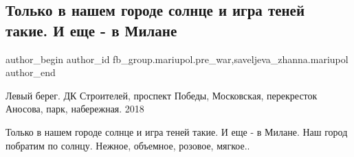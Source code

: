  
 
 
 
 

\subsection{Только в нашем городе солнце и игра теней такие. И еще - в Милане}
\label{sec:05_02_2023.fb.fb_group.mariupol.pre_war.1.tolko_v_nashem_gorod}
 
\ifcmt
 author_begin
   author_id fb_group.mariupol.pre_war,saveljeva_zhanna.mariupol
 author_end
\fi

Левый берег. ДК Строителей, проспект Победы, Московская, перекресток Аносова,
парк, набережная. 2018

Только в нашем городе солнце и игра теней такие. И еще - в Милане. Наш город
побратим по солнцу. Нежное, объемное, розовое, мягкое..

